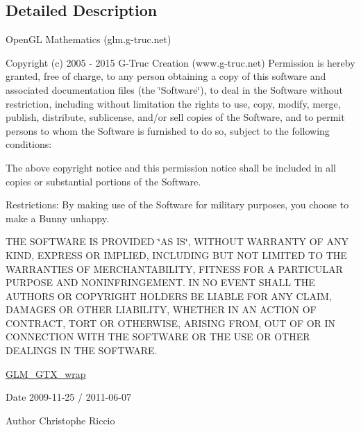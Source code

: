 \subsection{Detailed Description}
Open\+G\+L Mathematics (glm.\+g-\/truc.\+net)

Copyright (c) 2005 -\/ 2015 G-\/\+Truc Creation (www.\+g-\/truc.\+net) Permission is hereby granted, free of charge, to any person obtaining a copy of this software and associated documentation files (the \char`\"{}\+Software\char`\"{}), to deal in the Software without restriction, including without limitation the rights to use, copy, modify, merge, publish, distribute, sublicense, and/or sell copies of the Software, and to permit persons to whom the Software is furnished to do so, subject to the following conditions\+:

The above copyright notice and this permission notice shall be included in all copies or substantial portions of the Software.

Restrictions\+: By making use of the Software for military purposes, you choose to make a Bunny unhappy.

T\+H\+E S\+O\+F\+T\+W\+A\+R\+E I\+S P\+R\+O\+V\+I\+D\+E\+D \char`\"{}\+A\+S I\+S\char`\"{}, W\+I\+T\+H\+O\+U\+T W\+A\+R\+R\+A\+N\+T\+Y O\+F A\+N\+Y K\+I\+N\+D, E\+X\+P\+R\+E\+S\+S O\+R I\+M\+P\+L\+I\+E\+D, I\+N\+C\+L\+U\+D\+I\+N\+G B\+U\+T N\+O\+T L\+I\+M\+I\+T\+E\+D T\+O T\+H\+E W\+A\+R\+R\+A\+N\+T\+I\+E\+S O\+F M\+E\+R\+C\+H\+A\+N\+T\+A\+B\+I\+L\+I\+T\+Y, F\+I\+T\+N\+E\+S\+S F\+O\+R A P\+A\+R\+T\+I\+C\+U\+L\+A\+R P\+U\+R\+P\+O\+S\+E A\+N\+D N\+O\+N\+I\+N\+F\+R\+I\+N\+G\+E\+M\+E\+N\+T. I\+N N\+O E\+V\+E\+N\+T S\+H\+A\+L\+L T\+H\+E A\+U\+T\+H\+O\+R\+S O\+R C\+O\+P\+Y\+R\+I\+G\+H\+T H\+O\+L\+D\+E\+R\+S B\+E L\+I\+A\+B\+L\+E F\+O\+R A\+N\+Y C\+L\+A\+I\+M, D\+A\+M\+A\+G\+E\+S O\+R O\+T\+H\+E\+R L\+I\+A\+B\+I\+L\+I\+T\+Y, W\+H\+E\+T\+H\+E\+R I\+N A\+N A\+C\+T\+I\+O\+N O\+F C\+O\+N\+T\+R\+A\+C\+T, T\+O\+R\+T O\+R O\+T\+H\+E\+R\+W\+I\+S\+E, A\+R\+I\+S\+I\+N\+G F\+R\+O\+M, O\+U\+T O\+F O\+R I\+N C\+O\+N\+N\+E\+C\+T\+I\+O\+N W\+I\+T\+H T\+H\+E S\+O\+F\+T\+W\+A\+R\+E O\+R T\+H\+E U\+S\+E O\+R O\+T\+H\+E\+R D\+E\+A\+L\+I\+N\+G\+S I\+N T\+H\+E S\+O\+F\+T\+W\+A\+R\+E.

\hyperlink{group__gtx__wrap}{G\+L\+M\+\_\+\+G\+T\+X\+\_\+wrap}

\begin{DoxyDate}{Date}
2009-\/11-\/25 / 2011-\/06-\/07 
\end{DoxyDate}
\begin{DoxyAuthor}{Author}
Christophe Riccio 
\end{DoxyAuthor}
